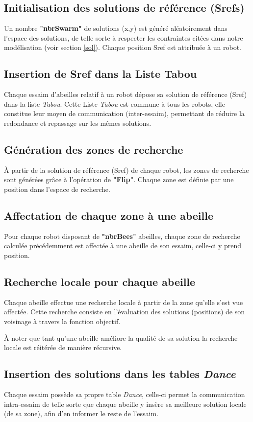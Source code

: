 \subsection{Initialisation des solutions de référence (Srefs)} 
Un nombre \textbf{"nbrSwarm"} de solutions (x,y) est généré aléatoirement dans l'espace des solutions, de telle sorte à respecter les contraintes citées dans notre modélisation (voir section \ref{sol}).
Chaque position Sref est attribuée à un robot.


\subsection{Insertion de Sref dans la Liste Tabou}
Chaque essaim d'abeilles relatif à un robot dépose sa solution de référence (Sref) dans la liste \textit{Tabou}. Cette Liste \textit{Tabou} est commune à tous les robots, elle constitue leur moyen de communication (inter-essaim), permettant de réduire la redondance et repassage sur les mêmes solutions.

\subsection{Génération des zones de recherche }
À partir de la solution de référence (Sref) de chaque robot, les zones de recherche sont générées grâce à l'opération de \textbf{"Flip"}. Chaque zone est définie par une position dans l'espace de recherche.

\subsection{Affectation de chaque zone à une abeille }
Pour chaque robot disposant de \textbf{"nbrBees"} abeilles, chaque zone de recherche calculée précédemment est affectée à une abeille de son essaim, celle-ci y prend position.

\subsection{Recherche locale pour chaque abeille}
Chaque abeille effectue une recherche locale à partir de la zone qu'elle s'est vue affectée. Cette recherche consiste en l'évaluation des solutions (positions) de son voisinage à travers la fonction objectif.

À noter que tant qu'une abeille améliore la qualité de sa solution la recherche locale est réitérée de manière récursive.

\subsection{Insertion des solutions dans les tables \textit{Dance}}
Chaque essaim possède sa propre table \textit{Dance}, celle-ci permet la communication intra-essaim de telle sorte que chaque abeille y insère sa meilleure solution locale (de sa zone), afin d'en informer le reste de l'essaim. 


